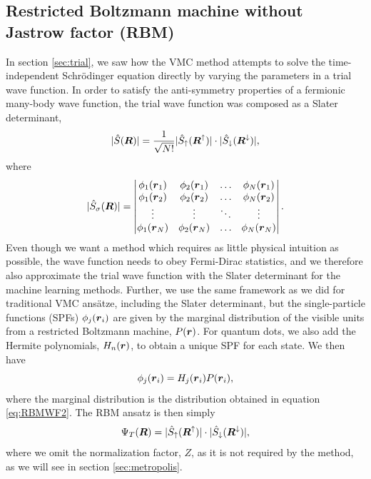 \subsection{Restricted Boltzmann machine without Jastrow factor (RBM)} \label{sec:rbm}
In section \ref{sec:trial}, we saw how the VMC method attempts to solve the time-independent Schrödinger equation directly by varying the parameters in a trial wave function. In order to satisfy the anti-symmetry properties of a fermionic many-body wave function, the trial wave function was composed as a Slater determinant,
\begin{equation}
|\hat{S}(\boldsymbol{{R}})|=\frac{1}{\sqrt{N!}}|\hat{S}_{\uparrow}(\boldsymbol{{R}}^{\uparrow})|\cdot |\hat{S}_{\downarrow}(\boldsymbol{{R}}^{\downarrow})|,
\end{equation}
where
\begin{equation}
|\hat{S}_{\sigma}(\boldsymbol{{R}})|=
\begin{vmatrix}
\phi_1(\boldsymbol{r}_1) & \phi_2(\boldsymbol{r}_1) & \hdots & \phi_N(\boldsymbol{r}_1)\\
\phi_1(\boldsymbol{r}_2) & \phi_2(\boldsymbol{r}_2) & \hdots & \phi_N(\boldsymbol{r}_2)\\
\vdots & \vdots & \ddots & \vdots \\
\phi_1(\boldsymbol{r}_N) & \phi_2(\boldsymbol{r}_N) & \hdots & \phi_N(\boldsymbol{r}_N)
\end{vmatrix}.
\end{equation}
Even though we want a method which requires as little physical intuition as possible, the wave function needs to obey Fermi-Dirac statistics, and we therefore also approximate the trial wave function with the Slater determinant for the machine learning methods. Further, we use the same framework as we did for traditional VMC ansätze, including the Slater determinant, but the single-particle functions (SPFs) $\phi_j(\boldsymbol{{r}}_i)$ are given by the marginal distribution of the visible units from a restricted Boltzmann machine, $P(\boldsymbol{{r}})$. For quantum dots, we also add the Hermite polynomials, $H_n(\boldsymbol{{r}})$, to obtain a unique SPF for each state. We then have
\begin{equation}
\phi_j(\boldsymbol{{r}}_i)=H_j(\boldsymbol{{r}}_i)P(\boldsymbol{{r}}_i),
\end{equation}
where the marginal distribution is the distribution obtained in equation \eqref{eq:RBMWF2}. The RBM ansatz is then simply
\begin{equation}
\Psi_T(\boldsymbol{{R}})=|\hat{S}_{\uparrow}(\boldsymbol{{R}}^{\uparrow})|\cdot |\hat{S}_{\downarrow}(\boldsymbol{{R}}^{\downarrow})|,
\end{equation}
where we omit the normalization factor, $Z$, as it is not required by the method, as we will see in section \ref{sec:metropolis}.

